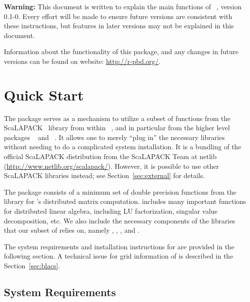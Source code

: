 {\color{red} \bf Warning:} This document is written to explain the main
functions of ~\citep{Chen2012pbdSLAPpackage}, version 0.1-0.
Every effort will be made to ensure future versions are consistent with
these instructions, but features in later versions may not be explained
in this document.

Information about the functionality of this package,
and any changes in future versions can be found on website:
\url{http://r-pbd.org/}.



\section[Quick Start]{Quick Start}
\label{sec:quick_start}

The  package serves as a mechanism to utilize a subset of
functions from the ScaLAPACK~\citep{ScaLAPACK1997} library from within
~\citep{Rcore}, and in particular from the higher level
 packages ~\citep{Schmidt2012pbdBASEpackage} and
~\citep{Schmidt2012pbdDMATpackage}. It allows one to merely
``plug in'' the necessary libraries without needing to do a complicated
system installation.  It is a bundling of the official ScaLAPACK distribution
from the ScaLAPACK Team at netlib (\url{http://www.netlib.org/scalapack/}).
However, it is possible to use other ScaLAPACK libraries instead; see
Section~\ref{sec:external} for details.

The  package consists of a minimum set of double precision
functions from the  library
for 's distributed matrix computation. 
includes many important functions for distributed linear algebra, including
LU factorization, singular value decomposition, etc.
We also include the necessary components of the libraries that our subset of
 relies on, namely ,
, , and .  

The system requirements and installation instructions for  are
provided in the following section.
A technical issue for grid information of  is described in
the Section~\ref{sec:blacs}.


\subsection[System Requirements]{System Requirements}
\label{sec:system_requirements}

